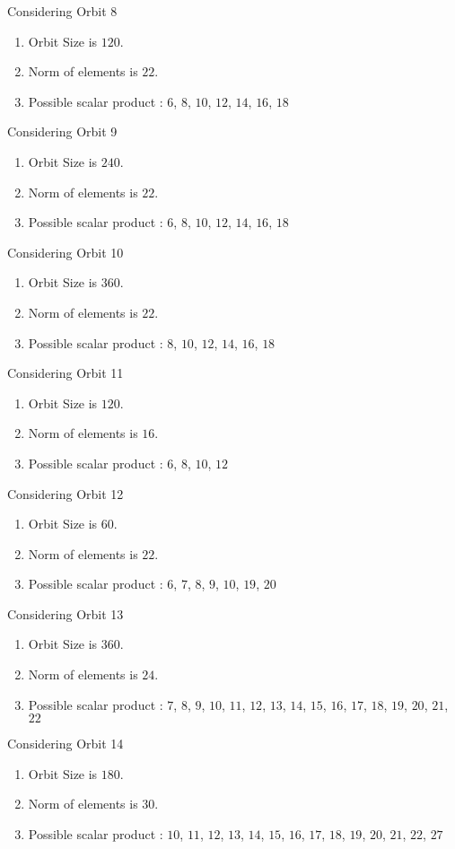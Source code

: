 \documentclass[12pt]{article}
\begin{document}
Considering Orbit 8
\begin{enumerate}
\item Orbit Size is $120$.
\item Norm of elements is $22$.
\item Possible scalar product : $6$, $8$, $10$, $12$, $14$, $16$, $18$
\end{enumerate}
Considering Orbit 9
\begin{enumerate}
\item Orbit Size is $240$.
\item Norm of elements is $22$.
\item Possible scalar product : $6$, $8$, $10$, $12$, $14$, $16$, $18$
\end{enumerate}
Considering Orbit 10
\begin{enumerate}
\item Orbit Size is $360$.
\item Norm of elements is $22$.
\item Possible scalar product : $8$, $10$, $12$, $14$, $16$, $18$
\end{enumerate}
Considering Orbit 11
\begin{enumerate}
\item Orbit Size is $120$.
\item Norm of elements is $16$.
\item Possible scalar product : $6$, $8$, $10$, $12$
\end{enumerate}
Considering Orbit 12
\begin{enumerate}
\item Orbit Size is $60$.
\item Norm of elements is $22$.
\item Possible scalar product : $6$, $7$, $8$, $9$, $10$, $19$, $20$
\end{enumerate}
Considering Orbit 13
\begin{enumerate}
\item Orbit Size is $360$.
\item Norm of elements is $24$.
\item Possible scalar product : $7$, $8$, $9$, $10$, $11$, $12$, $13$, $14$, $15$, $16$, $17$, $18$, $19$, $20$, $21$, $22$
\end{enumerate}
Considering Orbit 14
\begin{enumerate}
\item Orbit Size is $180$.
\item Norm of elements is $30$.
\item Possible scalar product : $10$, $11$, $12$, $13$, $14$, $15$, $16$, $17$, $18$, $19$, $20$, $21$, $22$, $27$
\end{enumerate}
\end{document}
